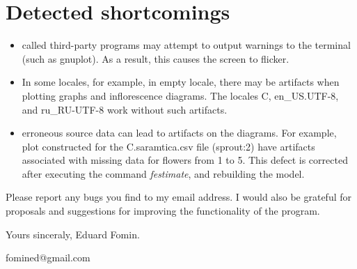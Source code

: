 \documentclass[a4paper]{article}
\begin{document}
\section{Detected shortcomings}
\begin{itemize}
\item called third-party programs may attempt to output warnings to the terminal (such as gnuplot). As a result, this causes the screen to flicker.
\item In some locales, for example, in empty locale, there may be artifacts when plotting graphs and inflorescence diagrams. The locales C, en\_US.UTF-8, and ru\_RU-UTF-8 work without such artifacts.
\item erroneous source data can lead to artifacts on the diagrams. For example, plot constructed for the C.saramtica.csv file (sprout:2) have artifacts associated with missing data for flowers from 1 to 5. This defect is corrected after executing the command \textit{festimate}, and rebuilding the model.
\end{itemize}

Please report any bugs you find to my email address. I would also be grateful for proposals and suggestions for improving the functionality of the program.

\vspace*{4em plus 5em minus 2em}

Yours sinceraly, Eduard Fomin.

fomined@gmail.com
\end{document}
